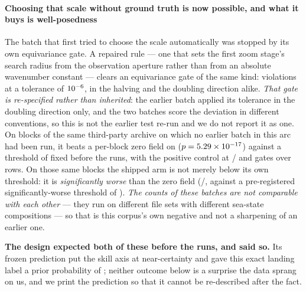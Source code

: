 \documentclass[review]{elsarticle}
\begin{document}
\paragraph{Choosing that scale without ground truth is now possible, and what it buys
is well-posedness} The batch that first tried to choose the scale automatically was
stopped by its own equivariance gate. A repaired rule --- one that sets the first
zoom stage's search radius from the observation aperture rather than from an absolute
wavenumber constant --- clears an equivariance gate of the same kind:
\TSixteenEquivarViol{} violations at a tolerance of $10^{-6}{}$, in the
halving and the doubling direction alike. \emph{That gate is re-specified rather than
inherited}: the earlier batch applied its tolerance in the doubling direction only,
and the two batches score the deviation in different conventions, so this is not the
earlier test re-run and we do not report it as one. On \TSixteenN{} blocks of the same third-party archive on which no earlier
batch in this arc had been run, it beats a per-block zero field on \TSixteenSkillWin{}
($p = 5.29\times 10^{-17}{}$) against a threshold of \TSixteenSkillThresh{} fixed before
the runs, with the positive control at \TSixteenPosCtrlWin{}/\TSixteenN{} and gates
\TSixteenGates{} over \TSixteenRows{} rows. On those same blocks the shipped arm is
not merely below its own threshold: it is \emph{significantly worse} than the zero
field (\TSixteenShipZeroWin{}/\TSixteenN{}, against a pre-registered
significantly-worse threshold of \TSixteenSigWorseThresh{}). \emph{The counts of
these batches are not comparable with each other} --- they run on different file
sets with different sea-state compositions --- so that is this corpus's own negative
and not a sharpening of an earlier one.

\textbf{The design expected both of these before the runs, and said so.} Its frozen
prediction put the skill axis at near-certainty and gave this exact landing label a
prior probability of \TSixteenPriorD{}; neither outcome below is a surprise the data
sprang on us, and we print the prediction so that it cannot be re-described after the
fact.
\end{document}
